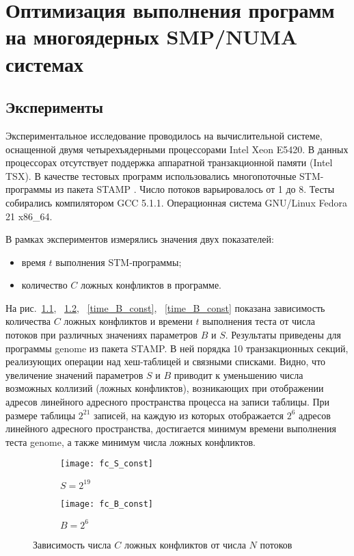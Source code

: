 \chapter{Оптимизация выполнения программ на многоядерных SMP/NUMA системах} \label{chapt3}

\section{Эксперименты}
Экспериментальное исследование проводилось на вычислительной системе, оснащенной двумя четырехъядерными процессорами Intel Xeon E5420. В данных процессорах отсутствует поддержка аппаратной транзакционной памяти (Intel TSX). В качестве тестовых программ использовались многопоточные STM-программы из пакета STAMP \cite{}. Число потоков варьировалось от 1 до 8. Тесты собирались компилятором GCC 5.1.1. Операционная система GNU/Linux Fedora 21 x86\_64. 

В рамках экспериментов измерялись значения двух показателей:
\begin{itemize}
\item время $t$ выполнения STM-программы;
\item количество $C$ ложных конфликтов в программе.
\end{itemize}

На рис.~\ref{fc_S_const}, ~\ref{fc_B_const}, ~\ref{time_B_const}, ~\ref{time_B_const} показана зависимость количества $C$ ложных конфликтов и времени $t$ выполнения теста от числа потоков при различных значениях параметров $B$ и $S$. Результаты приведены для программы genome из пакета STAMP. В ней порядка 10 транзакционных секций, реализующих операции над хеш-таблицей и связными списками. Видно, что увеличение значений параметров $S$ и $B$ приводит к уменьшению числа возможных коллизий (ложных конфликтов), возникающих при отображении адресов линейного адресного пространства процесса на записи таблицы. При размере таблицы $2^{21}$ записей, на каждую из которых отображается $2^{6}$ адресов линейного адресного пространства, достигается минимум времени выполнения теста genome, а также минимум числа ложных конфликтов. 

\begin{figure}
\centering
\begin{subfigure}{0.5\textwidth}
  \centering
  \texttt{[image: fc\_S\_const]}
  \caption{$S = 2^{19}$}
  \label{fc_S_const}
\end{subfigure}%
\begin{subfigure}{0.5\textwidth}
  \centering
  \texttt{[image: fc\_B\_const]}
  \caption{$B = 2^6$}
  \label{fc_B_const}
\end{subfigure}
\caption{Зависимость числа $C$ ложных конфликтов от числа $N$ потоков}
\label{fc_N}
\end{figure}

